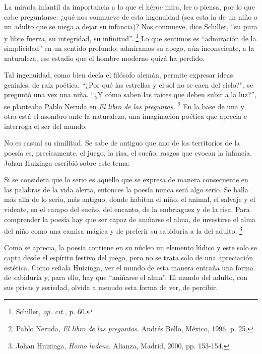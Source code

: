 \documentclass[14pt,twoside,final]{extbook} %
\let\oldfootnote\footnote
\renewcommand\footnote[1]{%
\oldfootnote{\hspace{1mm}#1}}
\begin{document}
La mirada infantil da importancia a lo que el héroe mira, lee o piensa, por lo que cabe preguntarse: ¿qué nos conmueve de esta ingenuidad (sea esta la de un niño o un adulto que se niega a dejar su infancia)? Nos conmueve, dice Schiller, ``su pura y libre fuerza, su integridad, su infinitud''.\footnote{Schiller, \emph{op. cit.,} p. 60.} Lo que sentimos es ``admiración de la simplicidad'' en un sentido profundo; admiramos su apego, aún inconsciente, a la naturaleza, ese estadio que el hombre moderno quizá ha perdido.

Tal ingenuidad, como bien decía el filósofo alemán, permite expresar ideas geniales, de raíz poética. ``¿Por qué las estrellas y el sol no se caen del cielo?'', se preguntó una vez una niña. ``¿Y cómo saben las raíces que deben subir a la luz?'', se planteaba Pablo Neruda en \emph{El libro de las preguntas.}\footnote{Pablo Neruda, \emph{El libro de las preguntas.} Andrés Bello, México, 1996, p. 25.} En la base de una y otra está el asombro ante la naturaleza, una imaginación poética que aprecia e interroga el ser del mundo.

No es casual su similitud. Se sabe de antiguo que uno de los territorios de la poesía es, precisamente, el juego, la risa, el sueño, rasgos que evocan la infancia. Johan Huizinga escribió sobre este tema:
\begin{quoting}
Si se considera que lo serio es aquello que se expresa de manera consecuente en las palabras de la vida alerta, entonces la poesía nunca será algo serio. Se halla más allá de lo serio, más antiguo, donde habitan el niño, el animal, el salvaje y el vidente, en el campo del sueño, del encanto, de la embriaguez y de la risa. Para comprender la poesía hay que ser capaz de aniñarse el alma, de investirse el alma del niño como una camisa mágica y de preferir su sabiduría a la del adulto.\footnote{Johan Huizinga, \emph{Homo ludens.} Alianza, Madrid, 2000, pp. 153-154.}
\end{quoting}
Como se aprecia, la poesía contiene en su núcleo un elemento lúdico y este solo se capta desde el espíritu festivo del juego, pero no se trata solo de una apreciación estética. Como señala Huizinga, ver el mundo de esta manera entraña una forma de sabiduría y, para ello, hay que ``aniñarse el alma''. El mundo del adulto, con sus prisas y seriedad, olvida a menudo esta forma de ver, de percibir.
\end{document}
